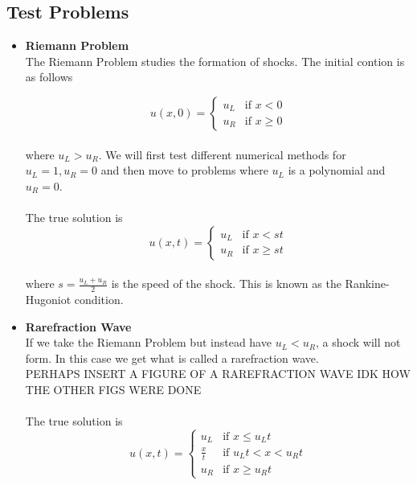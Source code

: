 \documentclass{myproject}
\begin{document}
\subsection{Test Problems}
\begin{itemize}
	\item \textbf{Riemann Problem}
	\\The Riemann Problem studies the formation of shocks. The initial contion is as follows

	\begin{equation}
		u(x,0) = 
	    \begin{cases}
	      	u_L & \text{if } x < 0 \\
			u_R & \text{if } x \geq 0
	    \end{cases}
	\end{equation}
	\\where $u_L > u_R$. We will first test different numerical methods for $u_L = 1, u_R = 0$ and then move to problems where $u_L$ is a polynomial and $u_R = 0$.
	\\\\The true solution is
	\begin{equation}
		u(x,t) = 
	    \begin{cases}
	      	u_L & \text{if } x < st \\
			u_R & \text{if } x \geq st
	    \end{cases}
	\end{equation}
	\\where $s = \frac{u_L + u_R}{2}$ is the speed of the shock. This is known as the Rankine-Hugoniot condition.
	
	\item \textbf{Rarefraction Wave}
	\\If we take the Riemann Problem but instead have $u_L < u_R$, a shock will not form. In this case we get what is called a rarefraction wave.
	\\PERHAPS INSERT A FIGURE OF A RAREFRACTION WAVE IDK HOW THE OTHER FIGS WERE DONE
	\\\\The true solution is
	\begin{equation}
		u(x,t) = 
	    \begin{cases}
	      	u_L & \text{if } x \leq {u_L}t \\
			\frac{x}{t} & \text{if } {u_L}t < x < {u_R}t \\
			u_R & \text{if } x \geq {u_R}t
	    \end{cases}
	\end{equation}


\end{itemize}
\end{document}
